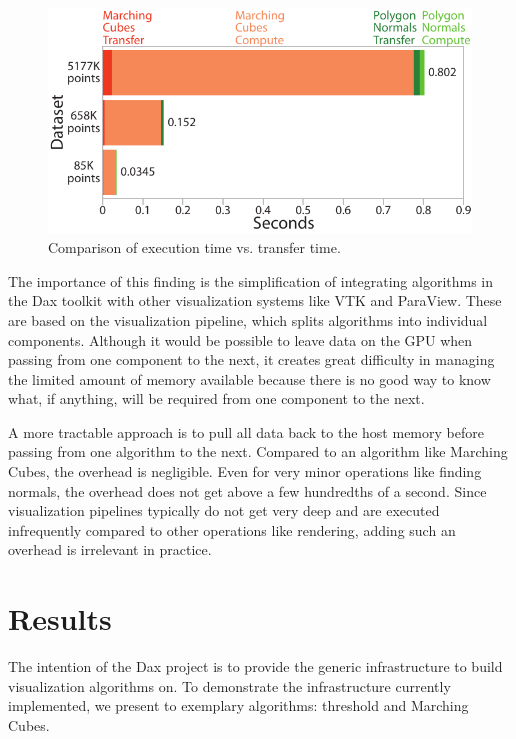 \begin{figure}[htb]
  \centering
  \includegraphics{images/TransferVsExecution}
  \caption{Comparison of execution time vs. transfer time.}
  \label{fig:TransferVsExecution}
\end{figure}

The importance of this finding is the simplification of integrating
algorithms in the Dax toolkit with other visualization systems like VTK and
ParaView. These are based on the visualization
pipeline, which splits algorithms into individual
components. Although it would be possible to leave data on the GPU when
passing from one component to the next, it creates great difficulty in
managing the limited amount of memory available because there is no good
way to know what, if anything, will be required from one component to the
next.

A more tractable approach is to pull all data back to the host memory
before passing from one algorithm to the next. Compared to an algorithm
like Marching Cubes, the overhead is negligible. Even for very minor
operations like finding normals, the overhead does not get above a few
hundredths of a second. Since visualization pipelines typically do not get
very deep and are executed infrequently compared to other operations like
rendering, adding such an overhead is irrelevant in practice.

\section{Results}

The intention of the Dax project is to provide the generic infrastructure
to build visualization algorithms on. To demonstrate the infrastructure
currently implemented, we present to exemplary algorithms: threshold and
Marching Cubes.

